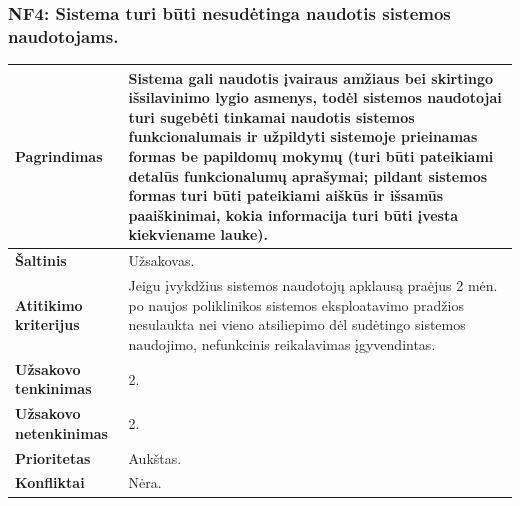 \documentclass[12pt]{article}
\begin{document}
\subsubsection*{NF4: Sistema turi būti nesudėtinga naudotis sistemos
naudotojams.}
\label{sec:NF4}
\begin{table}[htb!]
    \captionsetup{justification=centering}
    \begin{tabular}{|m{4.9cm}|m{11cm}|}
        \hline
        \raggedleft \textbf{\cellcolor{deepchampagne}Pagrindimas} &
        Sistema gali naudotis įvairaus amžiaus bei skirtingo išsilavinimo lygio
        asmenys, todėl sistemos naudotojai turi sugebėti tinkamai naudotis
        sistemos funkcionalumais ir užpildyti sistemoje prieinamas formas be
        papildomų mokymų (turi būti pateikiami detalūs funkcionalumų aprašymai;
        pildant sistemos formas turi būti pateikiami aiškūs ir išsamūs
        paaiškinimai, kokia informacija turi būti įvesta kiekviename lauke). \\
        \hline
        \raggedleft \textbf{\cellcolor{deepchampagne}Šaltinis} & Užsakovas. \\
        \hline
        \raggedleft \textbf{\cellcolor{deepchampagne}Atitikimo kriterijus} & 
        Jeigu įvykdžius sistemos naudotojų apklausą praėjus 2 mėn. po naujos
        poliklinikos sistemos eksploatavimo pradžios nesulaukta nei vieno
        atsiliepimo dėl sudėtingo sistemos naudojimo, nefunkcinis reikalavimas
        įgyvendintas. \\
        \hline
        \raggedleft \textbf{\cellcolor{deepchampagne}Užsakovo tenkinimas} & 2. \\
        \hline
        \raggedleft \textbf{\cellcolor{deepchampagne}Užsakovo netenkinimas} & 2. \\
        \hline
        \raggedleft \textbf{\cellcolor{deepchampagne}Prioritetas} & Aukštas. \\
        \hline
        \raggedleft \textbf{\cellcolor{deepchampagne}Konfliktai} & Nėra. \\
        \hline
    \end{tabular}
\end{table}
\end{document}
